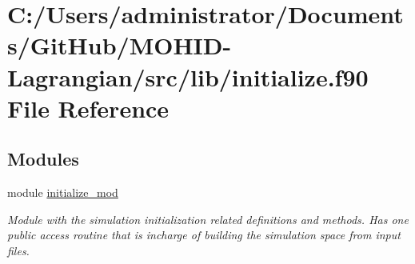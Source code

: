\hypertarget{initialize_8f90}{}\section{C\+:/\+Users/administrator/\+Documents/\+Git\+Hub/\+M\+O\+H\+I\+D-\/\+Lagrangian/src/lib/initialize.f90 File Reference}
\label{initialize_8f90}
\subsection*{Modules}
\begin{DoxyCompactItemize}
\item 
module \hyperlink{namespaceinitialize__mod}{initialize\+\_\+mod}
\begin{DoxyCompactList}\small\item\em Module with the simulation initialization related definitions and methods. Has one public access routine that is incharge of building the simulation space from input files. \end{DoxyCompactList}\end{DoxyCompactItemize}
